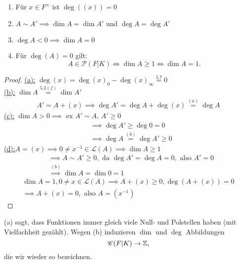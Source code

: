 \begin{korollar}
    \begin{enumerate}[label=(\alph*)]
        \item Für $x \in F^\times$ ist $\deg ((x)) = 0$
        \item $A \sim A' \implies \dim A = \dim A'$ und $\deg A = \deg A'$
        \item $\deg A < 0 \implies \dim A = 0$
        \item Für $\deg (A) = 0$ gilt:
        $$ A \in \mathscr{P}(F|K) \iff \dim A \geq 1 \iff \dim A =1.$$
    \end{enumerate}
\end{korollar}
\begin{proof}
    \underline{(a):} $\deg (x) = \deg (x)_0 - \deg (x)_\infty \stackrel{5.7}{=} 0$\\
    \underline{(b):} $\dim A \stackrel{5.3(f)}{=} \dim A'$ 
    \begin{align*}
        A' = A + (x) \implies \deg A' = \deg A + \deg (x) \stackrel{(a)}{=} \deg A
    \end{align*}
    \underline{(c):} $\dim A > 0 \implies$ ex $A' \sim A$, $A' \geq 0$
    \begin{align*}
        & \implies \deg A' \geq \deg 0 = 0\\
        & \implies \deg A \stackrel{(b)}{=} \deg A' \geq 0
    \end{align*}
    \underline{(d):}$A=(x) \implies 0 \ne x^{-1} \in \mathcal{L}(A) \implies \dim A \geq 1$
    \begin{align*}
        & \implies A \sim A' \geq 0, \text{ da } \deg A' = \deg A =0, \text{ also } A'=0\\
        &\stackrel{(b)}{\implies} \dim A = \dim 0 = 1
    \end{align*}
    \begin{align*}
        \dim A = 1, 0 \ne x \in \mathcal{L}(A) \implies A + (x) \geq 0, \deg (A+ (x)) = 0 \\
        \implies A + (x) = 0, \text{ also } A = (x^{-1})
    \end{align*}
\end{proof}

\begin{bemerkungnr}
    (a) sagt, dass Funktionen immer gleich viele Null- und Polstellen haben (mit Vielfachheit gezählt).
    Wegen (b) induzieren $\dim$ und $\deg$ Abbildungen
    $$ \mathscr{C}(F|K) \to \mathbb{Z},$$
    die wir wieder so bezeichnen.
\end{bemerkungnr}

